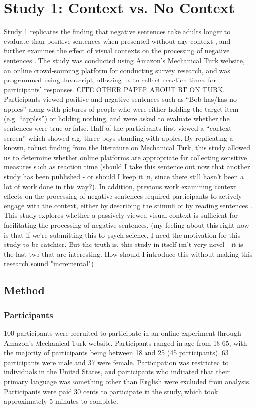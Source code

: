 \documentclass[10pt,letterpaper]{article}
\begin{document}
\section{Study 1: Context vs. No Context}
Study 1 replicates the finding that negative sentences take adults longer to evaluate than positive sentences when presented without any context \cite{hclark1972, carpenter1975, just1971, just1976}, and further examines the effect of visual contexts on the processing of negative sentences \cite{wason1965}.  The study was conducted using Amazon's Mechanical Turk website, an online crowd-sourcing platform for conducting survey research, and was programmed using Javascript, allowing us to collect reaction times for participants' responses.  CITE OTHER PAPER ABOUT RT ON TURK.  Participants viewed positive and negative sentences such as ``Bob has/has no apples'' along with pictures of people who were either holding the target item (e.g. ``apples'') or holding nothing, and were asked to evaluate whether the sentences were true or false.  Half of the participants first viewed a ``context screen'' which showed e.g. three boys standing with apples.  By replicating a known, robust finding from the literature on Mechanical Turk, this study allowed us to determine whether online platforms are appropriate for collecting sensitive measures such as reaction time (should I take this sentence out now that another study has been published - or should I keep it in, since there still hasn't been a lot of work done in this way?).  In addition, previous work examining context effects on the processing of negative sentences required participants to actively engage with the context, either by describing the stimuli \cite{wason1965} or by reading sentences \cite{dale2011, glenberg1999, ludtke2006}.  This study explores whether a passively-viewed visual context is sufficient for facilitating the processing of negative sentences.  (my feeling about this right now is that if we're submitting this to psych science, I need the motivation for this study to be catchier.  But the truth is, this study in itself isn't very novel - it is the last two that are interesting.  How should I introduce this without making this research sound "incremental")

\subsection{Method}

\subsubsection{Participants}
100 participants were recruited to participate in an online experiment through Amazon's Mechanical Turk website.  Participants ranged in age from 18-65, with the majority of participants being between 18 and 25 (45 participants).  63 participants were male and 37 were female.  Participation was restricted to individuals in the United States, and participants who indicated that their primary language was something other than English were excluded from analysis.  Participants were paid 30 cents to participate in the study, which took approximately 5 minutes to complete.  
\end{document}
